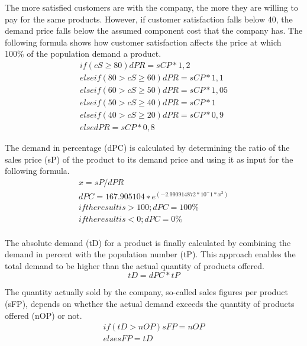 The more satisfied customers are with the company, the more they are willing to pay for the same products. However, if customer satisfaction falls below 40, the demand price falls below the assumed component cost that the company has. The following formula shows how customer satisfaction affects the price at which 100\% of the population demand a product.
\begin{equation}
\label{func:demandPrice}
\begin{aligned}
if ( cS \geq 80 ) { dPR = sCP * 1,2 } \\
elseif ( 80 > cS \geq 60 ){ dPR = sCP * 1,1 } \\
elseif ( 60 > cS \geq 50 ) { dPR = sCP * 1,05 } \\
elseif ( 50 > cS \geq 40 ) { dPR = sCP * 1 } \\
elseif ( 40 > cS \geq 20 ) { dPR = sCP * 0,9 } \\
else { dPR = sCP * 0,8 }  
\end{aligned}
\end{equation}

The demand in percentage (\gls{dPC}) is calculated by determining the ratio of the sales price (\gls{sP}) of the product to its demand price and using it as input for the following formula.
\begin{equation}
\label{func:demandPercentage}
\begin{aligned}
x = sP / dPR \\
dPC = 167.905104 ∗e^ (−2.990914872 * 10^ -1 * x^2) \\
if the result is > 100; dPC = 100\% \\
if the result is < 0; dPC = 0\% \\    
\end{aligned}
\end{equation}
 
The absolute demand (\gls{tD}) for a product is finally calculated by combining the demand in percent with the population number (\gls{tP}). This approach enables the total demand to be higher than the actual quantity of products offered.
\begin{equation}
tD= dPC * tP    
\end{equation}

The quantity actually sold by the company, so-called sales figures per product (\gls{sFP}), depends on whether the actual demand exceeds the quantity of products offered (\gls{nOP}) or not.
\begin{equation}
\label{func:salesFigure}
\begin{aligned}
if ( tD > nOP ) { sFP = nOP } \\
else { sFP = tD }    
\end{aligned}
\end{equation}

